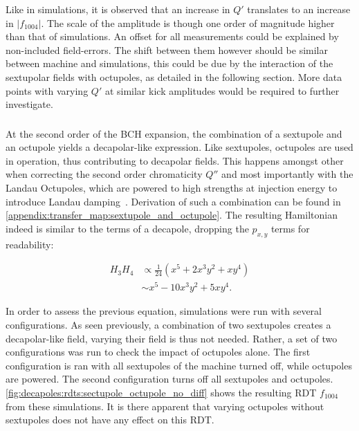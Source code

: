 Like in simulations, it is observed that an increase in $Q'$ translates to an increase in 
$|f_{1004}|$. The scale of the amplitude is though one order of magnitude higher than that of
simulations. An offset for all measurements could be explained by non-included field-errors. The
shift between them however should be similar between machine and simulations, this could be
due by the interaction of the sextupolar fields with octupoles, as detailed in the following
section. More data points with varying $Q'$ at similar kick amplitudes would be required to further
investigate.


\subsubsection{}


At the second order of the BCH expansion, the combination of a sextupole and an octupole yields a
decapolar-like expression.
Like sextupoles, octupoles are used in operation, thus contributing to decapolar fields. This
happens amongst other when correcting the second order chromaticity $Q''$ and most importantly with
the Landau Octupoles, which are powered to high strengths at injection energy to introduce Landau
damping~\cite{gareyte_landau_1997}.
Derivation of such a combination can be found in
\cref{appendix:transfer_map:sextupole_and_octupole}. The resulting Hamiltonian indeed is similar to
the terms of a decapole, dropping the $p_{x,y}$ terms for readability:

\begin{equation}
    \begin{aligned}
         H_3 H_4 &\propto \frac{1}{24} \left(x^5 + 2x^3y^2 + xy^4 \right)\\
                   &\sim    x^5 - 10x^3y^2 + 5xy^4.
    \end{aligned}
    \label{eq:decapoles:sextupole_octupole_b5}
\end{equation}

In order to assess the previous equation, simulations were run with several configurations.
As seen previously, a combination of two sextupoles creates a decapolar-like field, varying their 
field is thus not needed. Rather, a set of two configurations was run to check the impact of 
octupoles alone. The first configuration is ran with all sextupoles of the machine
turned off, while octupoles are powered. The second configuration turns off all sextupoles and
octupoles. \cref{fig:decapoles:rdts:sectupole_octupole_no_diff} shows the resulting RDT $f_{1004}$
from these simulations. It is there apparent that varying octupoles without sextupoles does not have 
any effect on this RDT.


